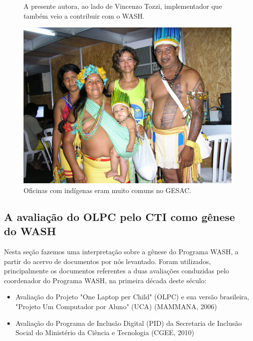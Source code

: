 \begin{figure}[htb]
\begin{minipage}[b]{0.4\linewidth}
                \caption{A presente autora, ao lado de Vincenzo Tozzi, implementador que também veio a contribuir com o WASH.}
                \label{4459669909728990ef00df4bdb6a369f3449704e}
\end{minipage}
\hspace{0.5cm}
\begin{minipage}[b]{0.4\linewidth}
        \centering
                \includegraphics[width=1.0\linewidth]{../../../imagens/povo.JPG}
                \caption{Oficinas com indígenas eram muito comuns no GESAC.}
                \label{50c13a4f82feece9e41db915d8e5bc4c5d5094dd}
\end{minipage}%
\hspace{0.5cm}
\end{figure}



\subsection[A avaliação do OLPC pelo CTI como gênese do WASH]{A avaliação do OLPC pelo CTI como gênese do WASH}\label{A avaliação do OLPC pelo CTI como gênese do WASH}
Nesta seção fazemos uma interpretação sobre a gênese do Programa WASH, a partir do acervo de documentos por nós levantado. Foram utilizados, principalmente  os documentos referentes a duas avaliações conduzidas pelo coordenador do Programa WASH, na primeira década deste século:


\begin{itemize}
\item Avaliação do Projeto "One Laptop per Child" (OLPC) e sua versão brasileira, "Projeto Um Computador por Aluno" (UCA) (MAMMANA, 2006)
\item Avaliação do Programa de Inclusão Digital (PID) da Secretaria de Inclusão Social do Ministério da Ciência e Tecnologia (CGEE, 2010)
\end{itemize}


